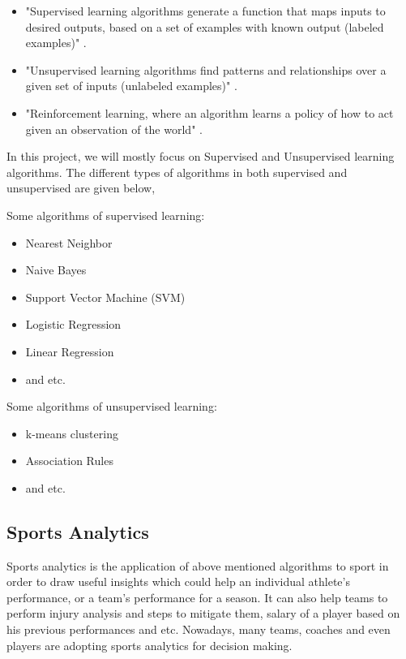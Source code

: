 \documentclass[format=sigconf]{acmart}
\begin{document}
\begin{itemize}
    \item "Supervised learning algorithms generate a function that maps inputs to desired outputs, based
    on a set of examples with known output (labeled examples)" \cite{tzanis2009machine}.
    \item "Unsupervised learning algorithms find patterns and relationships over a given set of inputs 
    (unlabeled examples)" \cite{tzanis2009machine}.
    \item "Reinforcement learning, where an algorithm learns a policy of how to act given an observation of the world" \cite{tzanis2009machine}.
\end{itemize}
In this project, we will mostly focus on Supervised and Unsupervised learning algorithms. The different types of algorithms in both
supervised and unsupervised are given below,

Some algorithms of supervised learning:
\begin{itemize}
    \item Nearest Neighbor
    \item Naive Bayes
    \item Support Vector Machine (SVM)
    \item Logistic Regression
    \item Linear Regression
    \item and etc.
\end{itemize}
Some algorithms of unsupervised learning:
\begin{itemize}
    \item k-means clustering
    \item Association Rules \cite{typeofml}
    \item and etc.
\end{itemize}
\subsection{Sports Analytics}
Sports analytics is the application of above mentioned algorithms to sport in order to draw useful insights which could help 
an individual athlete's performance, or a team's performance for a season. It can also help teams to perform injury analysis
and steps to mitigate them, salary of a player based on his previous performances and etc. Nowadays,  many teams, coaches and 
even players are adopting sports analytics for decision making.
\end{document}
